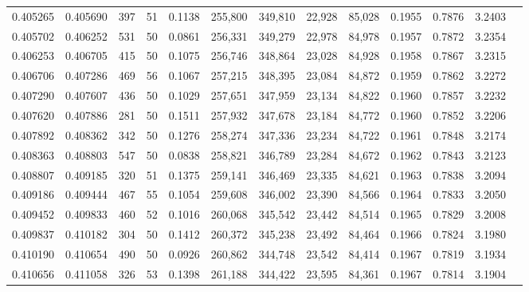 \begin{tabular}{rrrrrrrrrrrrr}
0.405265 & 0.405690 &   397 &  51 &                                     0.1138 & 255,800 & 349,810 &  22,928 &  85,028 & 0.1955 & 0.7876 & 3.2403 \\
0.405702 & 0.406252 &   531 &  50 &                                     0.0861 & 256,331 & 349,279 &  22,978 &  84,978 & 0.1957 & 0.7872 & 3.2354 \\
0.406253 & 0.406705 &   415 &  50 &                                     0.1075 & 256,746 & 348,864 &  23,028 &  84,928 & 0.1958 & 0.7867 & 3.2315 \\
0.406706 & 0.407286 &   469 &  56 &                                     0.1067 & 257,215 & 348,395 &  23,084 &  84,872 & 0.1959 & 0.7862 & 3.2272 \\
0.407290 & 0.407607 &   436 &  50 &                                     0.1029 & 257,651 & 347,959 &  23,134 &  84,822 & 0.1960 & 0.7857 & 3.2232 \\
0.407620 & 0.407886 &   281 &  50 &                                     0.1511 & 257,932 & 347,678 &  23,184 &  84,772 & 0.1960 & 0.7852 & 3.2206 \\
0.407892 & 0.408362 &   342 &  50 &                                     0.1276 & 258,274 & 347,336 &  23,234 &  84,722 & 0.1961 & 0.7848 & 3.2174 \\
0.408363 & 0.408803 &   547 &  50 &                                     0.0838 & 258,821 & 346,789 &  23,284 &  84,672 & 0.1962 & 0.7843 & 3.2123 \\
0.408807 & 0.409185 &   320 &  51 &                                     0.1375 & 259,141 & 346,469 &  23,335 &  84,621 & 0.1963 & 0.7838 & 3.2094 \\
0.409186 & 0.409444 &   467 &  55 &                                     0.1054 & 259,608 & 346,002 &  23,390 &  84,566 & 0.1964 & 0.7833 & 3.2050 \\
0.409452 & 0.409833 &   460 &  52 &                                     0.1016 & 260,068 & 345,542 &  23,442 &  84,514 & 0.1965 & 0.7829 & 3.2008 \\
0.409837 & 0.410182 &   304 &  50 &                                     0.1412 & 260,372 & 345,238 &  23,492 &  84,464 & 0.1966 & 0.7824 & 3.1980 \\
0.410190 & 0.410654 &   490 &  50 &                                     0.0926 & 260,862 & 344,748 &  23,542 &  84,414 & 0.1967 & 0.7819 & 3.1934 \\
0.410656 & 0.411058 &   326 &  53 &                                     0.1398 & 261,188 & 344,422 &  23,595 &  84,361 & 0.1967 & 0.7814 & 3.1904 \\

\end{tabular}

